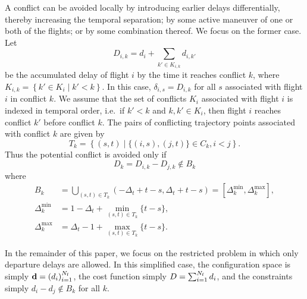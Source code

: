 A conflict can be avoided locally by introducing earlier delays differentially, thereby increasing the temporal separation; by some active maneuver of one or both of the flights; or by some combination thereof.
We focus on the former case.
Let 
\begin{equation}
\label{eq:accum-delay}
D_{i, k} = d_i + \sum_{k' \in K_{i, k}} d_{i,k'}
\end{equation}
be the accumulated delay of flight $i$ by the time it reaches conflict $k$,
where $K_{i, k} = \left\{k' \in K_i \middle| k' < k\right\}$.
In this case, $\delta_{i, s} = D_{i, k}$ for all $s$ associated with flight $i$ in conflict $k$.
We assume that the set of conflicts $K_i$ associated with flight $i$ is indexed in temporal order, i.e.\ if $k' < k$ and $k, k' \in K_i$, then flight $i$ reaches conflict $k'$ before conflict $k$.
The pairs of conflicting trajectory points associated with conflict $k$ are given by 
\begin{equation}
T_k = 
\left\{
(s, t) \middle| \{(i, s), (j, t)\} \in C_k, i < j
\right\}.
\end{equation}
Thus the potential conflict is avoided only if 
\begin{equation}
\label{eq:accum-delay-diff}
D_k = D_{i, k} - D_{j, k}
\notin
B_k 
\end{equation}
where 
\begin{align}
B_k &= 
\bigcup_{(s, t) \in T_k}
\left(-\Delta_t + t - s, \Delta_t + t - s\right)
=
[\Delta^{\min}_k, \Delta^{\max}_k], \\
\Delta^{\min}_k &= 1 - \Delta_t + \min_{(s, t) \in T_k} \{t - s\},\\
\Delta^{\max}_k &= \Delta_t - 1 + \max_{(s, t) \in T_k} \{t - s\}.
\end{align}


In the remainder of this paper, we focus on the restricted problem in which only departure delays are allowed.
In this simplified case, the configuration space is simply 
$\mathbf d = {\left(d_i\right)}_{i=1}^{N_{\mathrm{f}}}$, the cost function simply $D = \sum_{i = 1}^{N_{\mathrm{f}}} d_i$, and the constraints simply $d_i - d_j \notin B_k$ for all $k$.
